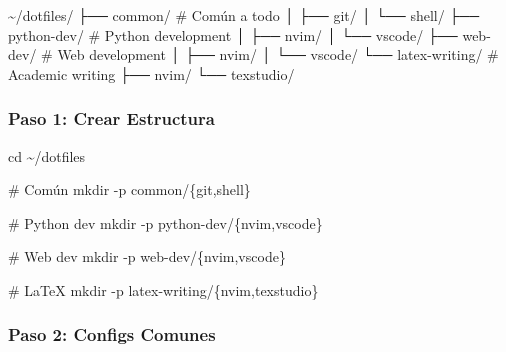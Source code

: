 \documentclass[
  doc,
  floatsintext,
  longtable,
  a4paper,
  nolmodern,
  notxfonts,
  notimes,
  12pt,
  colorlinks=true,linkcolor=blue,citecolor=blue,urlcolor=blue]{apa7}
\newenvironment{Shaded}{\begin{snugshade}}{\end{snugshade}}
\newcommand{\AttributeTok}[1]{\textcolor[rgb]{0.40,0.45,0.13}{#1}}
\newcommand{\BuiltInTok}[1]{\textcolor[rgb]{0.00,0.23,0.31}{#1}}
\newcommand{\CommentTok}[1]{\textcolor[rgb]{0.37,0.37,0.37}{#1}}
\newcommand{\DataTypeTok}[1]{\textcolor[rgb]{0.68,0.00,0.00}{#1}}
\newcommand{\ExtensionTok}[1]{\textcolor[rgb]{0.00,0.23,0.31}{#1}}
\newcommand{\FunctionTok}[1]{\textcolor[rgb]{0.28,0.35,0.67}{#1}}
\newcommand{\NormalTok}[1]{\textcolor[rgb]{0.00,0.23,0.31}{#1}}
\newcommand{\OperatorTok}[1]{\textcolor[rgb]{0.37,0.37,0.37}{#1}}
\begin{document}
\begin{Shaded}
\begin{Highlighting}[]
\ExtensionTok{\textasciitilde{}/dotfiles/}
\ExtensionTok{├──}\NormalTok{ common/           }\CommentTok{\# Común a todo}
\ExtensionTok{│}\NormalTok{   ├── git/}
\ExtensionTok{│}\NormalTok{   └── shell/}
\ExtensionTok{├──}\NormalTok{ python{-}dev/       }\CommentTok{\# Python development}
\ExtensionTok{│}\NormalTok{   ├── nvim/}
\ExtensionTok{│}\NormalTok{   └── vscode/}
\ExtensionTok{├──}\NormalTok{ web{-}dev/          }\CommentTok{\# Web development}
\ExtensionTok{│}\NormalTok{   ├── nvim/}
\ExtensionTok{│}\NormalTok{   └── vscode/}
\ExtensionTok{└──}\NormalTok{ latex{-}writing/    }\CommentTok{\# Academic writing}
    \ExtensionTok{├──}\NormalTok{ nvim/}
    \ExtensionTok{└──}\NormalTok{ texstudio/}
\end{Highlighting}
\end{Shaded}

\subsubsection{Paso 1: Crear Estructura}\label{paso-1-crear-estructura}

\begin{Shaded}
\begin{Highlighting}[]
\BuiltInTok{cd}\NormalTok{ \textasciitilde{}/dotfiles}

\CommentTok{\# Común}
\FunctionTok{mkdir} \AttributeTok{{-}p}\NormalTok{ common/}\DataTypeTok{\{git}\OperatorTok{,}\DataTypeTok{shell\}}

\CommentTok{\# Python dev}
\FunctionTok{mkdir} \AttributeTok{{-}p}\NormalTok{ python{-}dev/}\DataTypeTok{\{nvim}\OperatorTok{,}\DataTypeTok{vscode\}}

\CommentTok{\# Web dev}
\FunctionTok{mkdir} \AttributeTok{{-}p}\NormalTok{ web{-}dev/}\DataTypeTok{\{nvim}\OperatorTok{,}\DataTypeTok{vscode\}}

\CommentTok{\# LaTeX}
\FunctionTok{mkdir} \AttributeTok{{-}p}\NormalTok{ latex{-}writing/}\DataTypeTok{\{nvim}\OperatorTok{,}\DataTypeTok{texstudio\}}
\end{Highlighting}
\end{Shaded}

\subsubsection{Paso 2: Configs Comunes}\label{paso-2-configs-comunes}
\end{document}
